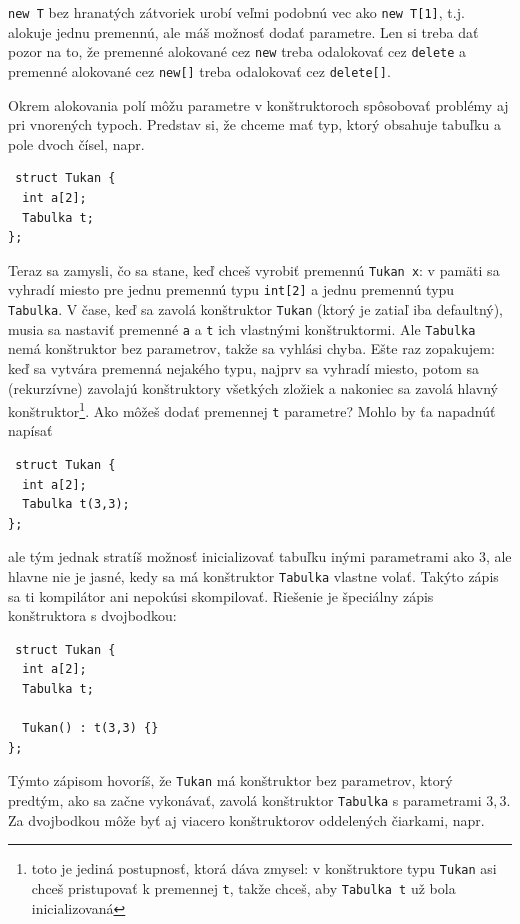 \documentclass[10pt]{article}
\def\prg{\lstinline}
\def\ods{\vspace*{10pt}}
\begin{document}
\prg!new T! bez hranatých zátvoriek urobí veľmi podobnú vec ako \prg!new T[1]!, t.j.
alokuje jednu premennú, ale máš možnosť dodať parametre. Len si treba dať pozor na to,
že premenné alokované cez \prg!new! treba odalokovať cez \prg!delete! a premenné alokované 
cez \prg!new[]! treba odalokovať cez \prg!delete[]!. 

\ods
Okrem alokovania polí môžu parametre v konštruktoroch spôsobovať problémy aj pri vnorených 
typoch. Predstav si, že chceme mať typ, ktorý obsahuje tabuľku a pole dvoch čísel, napr.

\begin{lstlisting}
 struct Tukan {
  int a[2];
  Tabulka t;
};
\end{lstlisting}

Teraz sa zamysli, čo sa stane, keď chceš vyrobiť premennú {\tt Tukan x}: v pamäti sa vyhradí 
miesto pre jednu premennú typu \prg!int[2]! a jednu premennú typu {\tt Tabulka}. V čase, keď
sa zavolá konštruktor {\tt Tukan} (ktorý je zatiaľ iba defaultný), musia sa nastaviť premenné
{\tt a} a {\tt t} ich vlastnými konštruktormi. Ale {\tt Tabulka} nemá konštruktor bez 
parametrov, takže sa vyhlási chyba. Ešte raz zopakujem: keď sa vytvára premenná nejakého typu,
najprv sa vyhradí miesto, potom sa (rekurzívne) zavolajú konštruktory všetkých zložiek
a nakoniec sa zavolá hlavný konštruktor\footnote{toto je jediná postupnosť, ktorá dáva zmysel:
v konštruktore typu {\tt Tukan} asi chceš pristupovať k premennej {\tt t},
takže chceš, aby {\tt Tabulka t} už bola inicializovaná}. Ako môžeš dodať premennej {\tt t}
parametre? Mohlo by ťa napadnúť napísať 

\begin{lstlisting}
 struct Tukan {
  int a[2];
  Tabulka t(3,3);
};
\end{lstlisting}

ale tým jednak stratíš možnosť inicializovať tabuľku inými parametrami ako $3$, ale hlavne
nie je jasné, kedy sa má konštruktor {\tt Tabulka} vlastne volať. Takýto zápis sa
ti kompilátor ani nepokúsi skompilovať. Riešenie je špeciálny zápis konštruktora s
dvojbodkou:

\begin{lstlisting}
 struct Tukan {
  int a[2];
  Tabulka t;

  Tukan() : t(3,3) {}
};
\end{lstlisting}

Týmto zápisom hovoríš, že {\tt Tukan} má konštruktor bez parametrov, ktorý predtým,
ako sa začne vykonávať, zavolá konštruktor {\tt Tabulka} s parametrami $3,3$.
Za dvojbodkou môže byť aj viacero konštruktorov oddelených čiarkami, napr.
\end{document}
